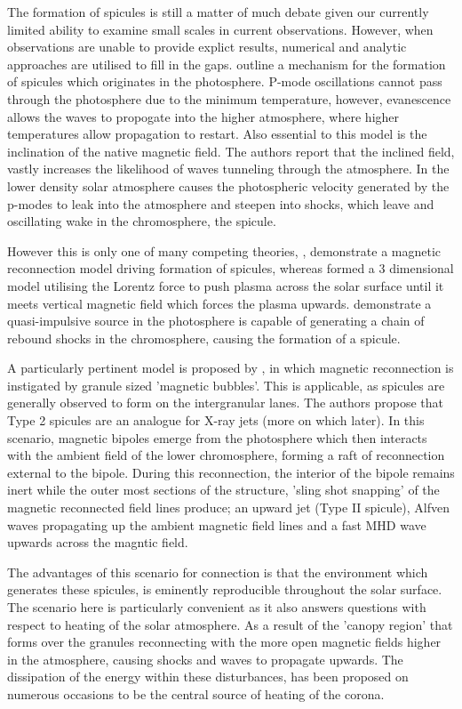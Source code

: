 The formation of spicules is still a matter of much debate given our currently limited ability to examine small scales in current observations. 
However, when observations are unable to provide explict results, numerical and analytic approaches are utilised to fill in the gaps.
\cite{DePointeu2004} outline a mechanism for the formation of spicules which originates in the photosphere.
P-mode oscillations cannot pass through the photosphere due to the minimum temperature, however, evanescence allows the waves to propogate into the higher atmosphere, where higher temperatures allow propagation to restart.
Also essential to this model is the inclination of the native magnetic field.
The authors report that the inclined field, vastly increases the likelihood of waves tunneling through the atmosphere. 
In the lower density solar atmosphere causes the photospheric velocity generated by the p-modes to leak into the atmosphere and steepen into shocks, which leave and oscillating wake in the chromosphere, the spicule.

However this is only one of many competing theories, \cite{Takeuchi2001}, demonstrate a magnetic reconnection model driving formation of spicules, whereas \cite{Martinez2011} formed a $3$ dimensional model utilising the Lorentz force to push plasma across the solar surface until it meets vertical magnetic field which forces the plasma upwards.
\cite{Hollweg1982} demonstrate a quasi-impulsive source in the photosphere is capable of generating a chain of rebound shocks in the chromosphere, causing the formation of a spicule.

A particularly pertinent model is proposed by \cite{Moore2011spic_recon}, in which magnetic reconnection is instigated by granule sized 'magnetic bubbles'.
This is applicable, as spicules are generally observed to form on the intergranular lanes.
The authors propose that Type 2 spicules are an analogue for X-ray jets (more on which later).
In this scenario, magnetic bipoles emerge from the photosphere which then interacts with the ambient field of the lower chromosphere, forming a raft of reconnection external to the bipole.
During this reconnection, the interior of the bipole remains inert while the outer most sections of the structure, 'sling shot snapping' of the magnetic reconnected field lines produce; an upward jet (Type II spicule), Alfven waves propagating up the ambient magnetic field lines and a fast MHD wave upwards across the magntic field.

The advantages of this scenario for connection is that the environment which generates these spicules, is eminently reproducible throughout the solar surface.
The scenario here is particularly convenient as it also answers questions with respect to heating of the solar atmosphere.
As a result of the 'canopy region' that forms over the granules reconnecting with the more open magnetic fields higher in the atmosphere, causing shocks and waves to propagate upwards.
The dissipation of the energy within these disturbances, has been proposed on numerous occasions to be the central source of heating of the corona.  

